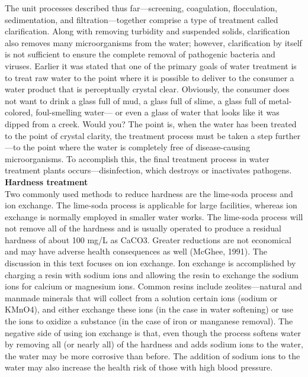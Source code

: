 \documentclass{article}
\begin{document}
The unit processes described thus far—screening, coagulation, flocculation, sedimentation, and filtration—together comprise a type of treatment called clarification. Along with removing turbidity and suspended solids, clarification also removes many microorganisms from the water; however, clarification by itself is not sufficient to ensure the complete removal of pathogenic bacteria and viruses.
Earlier it was stated that one of the primary goals of water treatment is to treat raw water to the point where it is possible to deliver to the consumer a water product that is perceptually crystal clear. Obviously, the consumer does not want to drink a glass full of mud, a glass full of slime, a glass full of metal-colored, foul-smelling water— or even a glass of water that looks like it was dipped from a creek. Would you? The point is, when the water has been treated to the point of crystal clarity, the treatment process must be taken a step further—to the point where the water is completely free of disease-causing microorganisms. To accomplish this, the final treatment process in water treatment plants occurs—disinfection, which destroys or inactivates pathogens.\\

\textbf{Hardness treatment}\\
Two commonly used methods to reduce hardness are the lime-soda process and ion exchange. The lime-soda process is applicable for large facilities, whereas ion exchange is normally employed in smaller water works. The lime-soda process will not remove all of the hardness and is usually operated to produce a residual hardness of about 100 mg/L as CaCO3. Greater reductions are not economical and may have adverse health consequences as well (McGhee, 1991). The discussion in this text focuses on ion exchange. Ion exchange is accomplished by charging a resin with sodium ions and allowing the resin to exchange the sodium ions for calcium or magnesium ions. Common resins include zeolites—natural and manmade minerals that will collect from a solution certain ions (sodium or KMnO4), and either exchange these ions (in the case in water softening) or use the ions to oxidize a substance (in the case of iron or manganese removal). The negative side of using ion exchange is that, even though the process softens water by removing all (or nearly all) of the hardness and adds sodium ions to the water, the water may be more corrosive than before. The addition of sodium ions to the water may also increase the health risk of those with high blood pressure.
\end{document}
